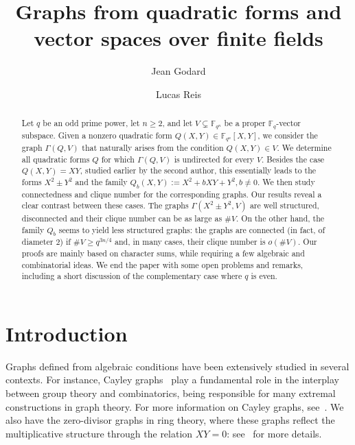 \documentclass[11pt]{amsart}
\author{Jean Godard}
\author{Lucas Reis}
\newcommand{\G}{\Gamma}
\newcommand{\F}{\mathbb F}
\theoremstyle{definition}
\theoremstyle{remark}
\begin{document}
\title[Graphs from quadratic forms and vector spaces]{Graphs from quadratic forms and vector spaces over finite fields} 


\maketitle

\begin{abstract}
Let $q$ be an odd prime power, let $n\ge 2$, and let $V\subsetneq \F_{q^n}$ be a proper $\F_q$-vector subspace. Given a nonzero quadratic form $Q(X,Y)\in \F_{q^n}[X,Y]$, we consider the graph $\G(Q,V)$ that naturally arises from the condition $Q(X,Y)\in V$. We determine all quadratic forms $Q$ for which $\G(Q,V)$ is undirected for every $V$. Besides the case $Q(X,Y)=XY$, studied earlier by the second author, this essentially leads to the forms $X^2\pm Y^2$ and the family $Q_b(X, Y):=X^2+bXY+Y^2, b\ne 0$. We then study connectedness and clique number for the corresponding graphs. Our results reveal a clear contrast between these cases. The graphs $\G(X^2\pm Y^2, V)$ are well structured, disconnected and their clique number can be as large as $\# V$. On the other hand, the family $Q_b$ seems to yield less structured graphs: the graphs are connected (in fact, of diameter $2$) if $\# V\ge q^{3n/4}$ and, in many cases, their clique number is $o(\# V)$. Our proofs are mainly based on character sums, while requiring a few algebraic and combinatorial ideas. We end the paper with some  open problems and remarks, including a short discussion of the complementary case where $q$ is even.
\end{abstract}


\section{Introduction} %
\label{intro}
Graphs defined from algebraic conditions have been extensively studied in several contexts. For instance, Cayley graphs~\cite{cayley1878} play a fundamental role in the interplay between group theory and combinatorics, being responsible for many extremal constructions in graph theory. For more information on Cayley graphs, see~\cite{babai1979, godsil2001, zhou2022}. We also have the zero-divisor graphs in ring theory, where these graphs reflect the multiplicative structure through the relation $XY=0$: see~\cite{akbari2006, anderson1999, anderson2011, beck1988} for more details.  
\end{document}

